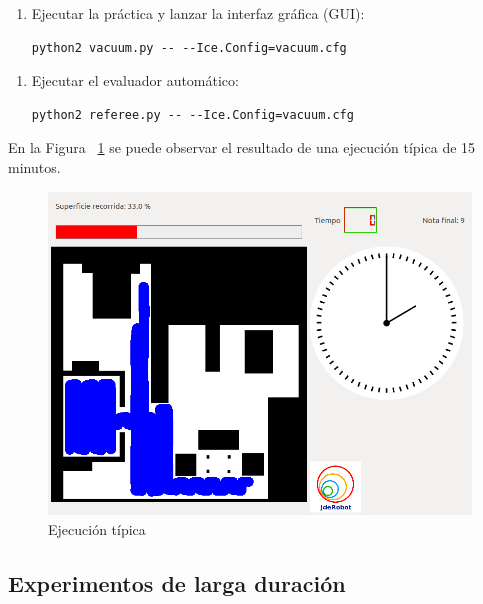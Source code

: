 \begin{enumerate}[2.]
\item	Ejecutar la práctica y lanzar la interfaz gráfica (GUI): 
	\begin{lstlisting}[frame=single]
		python2 vacuum.py -- --Ice.Config=vacuum.cfg
	\end{lstlisting} 
\end{enumerate}

\begin{enumerate}[3.]
\item	Ejecutar el evaluador automático: 
	\begin{lstlisting}[frame=single]
		python2 referee.py -- --Ice.Config=vacuum.cfg
  	\end{lstlisting} 
\end{enumerate}

En la Figura ~\ref{fig.ejTipica} se puede observar el resultado de una ejecución típica de 15 minutos.

\begin{figure}[H]
  \begin{center}
    \includegraphics[width=1.0\textwidth]{figures/Vacuum/ejecucionTipicaRefereeSala.png}
		\caption{Ejecución típica}
		\label{fig.ejTipica}
		\end{center}
\end{figure}


\subsection{Experimentos de larga duración}

